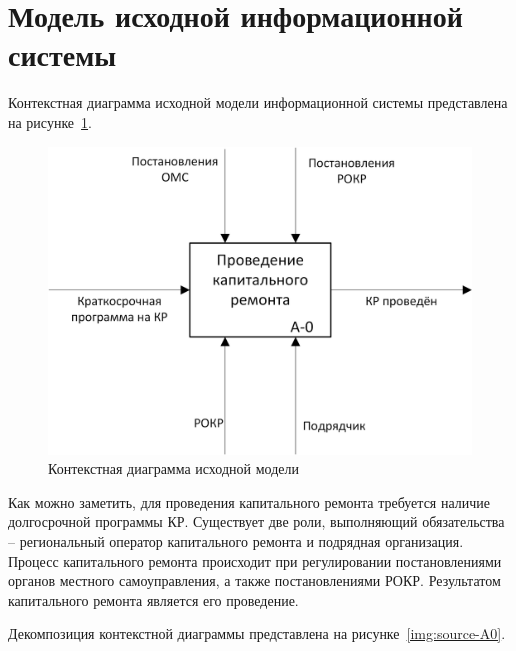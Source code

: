 \section{Модель исходной информационной системы}

Контекстная диаграмма исходной модели информационной системы представлена на рисунке~\ref{img:source-context}.

\begin{figure}[h!]
	\begin{center}
		\begin{minipage}[h]{\linewidth}
			\centering
			\includegraphics[width=\linewidth]{images/source-context.png}
			\caption{Контекстная диаграмма исходной модели}
			\label{img:source-context}
		\end{minipage}
		\hfill
	\end{center}
\end{figure}

Как можно заметить, для проведения капитального ремонта требуется наличие долгосрочной программы КР.
Существует две роли, выполняющий обязательства -- региональный оператор капитального ремонта и подрядная организация.
Процесс капитального ремонта происходит при регулировании постановлениями органов местного самоуправления, а также постановлениями РОКР.
Результатом капитального ремонта является его проведение.

Декомпозиция контекстной диаграммы представлена на рисунке~\ref{img:source-A0}.

